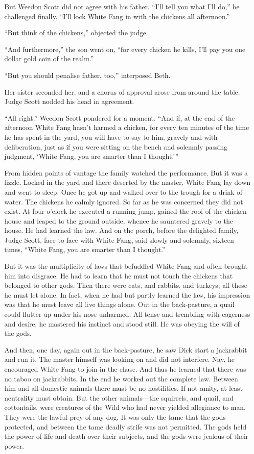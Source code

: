 \documentclass[10pt]{book}
\begin{document}
But Weedon Scott did not agree with his father. “I’ll tell you what
I’ll do,” he challenged finally. “I’ll lock White Fang in with the
chickens all afternoon.”

“But think of the chickens,” objected the judge.

“And furthermore,” the son went on, “for every chicken he kills, I’ll
pay you one dollar gold coin of the realm.”

“But you should penalise father, too,” interposed Beth.

Her sister seconded her, and a chorus of approval arose from around the
table. Judge Scott nodded his head in agreement.

“All right.” Weedon Scott pondered for a moment. “And if, at the end of
the afternoon White Fang hasn’t harmed a chicken, for every ten minutes
of the time he has spent in the yard, you will have to say to him,
gravely and with deliberation, just as if you were sitting on the bench
and solemnly passing judgment, ‘White Fang, you are smarter than I
thought.’”

From hidden points of vantage the family watched the performance. But
it was a fizzle. Locked in the yard and there deserted by the master,
White Fang lay down and went to sleep. Once he got up and walked over
to the trough for a drink of water. The chickens he calmly ignored. So
far as he was concerned they did not exist. At four o’clock he executed
a running jump, gained the roof of the chicken-house and leaped to the
ground outside, whence he sauntered gravely to the house. He had
learned the law. And on the porch, before the delighted family, Judge
Scott, face to face with White Fang, said slowly and solemnly, sixteen
times, “White Fang, you are smarter than I thought.”

But it was the multiplicity of laws that befuddled White Fang and often
brought him into disgrace. He had to learn that he must not touch the
chickens that belonged to other gods. Then there were cats, and
rabbits, and turkeys; all these he must let alone. In fact, when he had
but partly learned the law, his impression was that he must leave all
live things alone. Out in the back-pasture, a quail could flutter up
under his nose unharmed. All tense and trembling with eagerness and
desire, he mastered his instinct and stood still. He was obeying the
will of the gods.

And then, one day, again out in the back-pasture, he saw Dick start a
jackrabbit and run it. The master himself was looking on and did not
interfere. Nay, he encouraged White Fang to join in the chase. And thus
he learned that there was no taboo on jackrabbits. In the end he worked
out the complete law. Between him and all domestic animals there must
be no hostilities. If not amity, at least neutrality must obtain. But
the other animals—the squirrels, and quail, and cottontails, were
creatures of the Wild who had never yielded allegiance to man. They
were the lawful prey of any dog. It was only the tame that the gods
protected, and between the tame deadly strife was not permitted. The
gods held the power of life and death over their subjects, and the gods
were jealous of their power.
\end{document}
